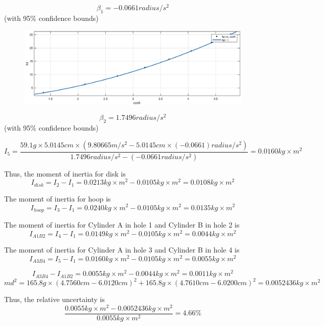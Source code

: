 $$ \beta_1 = -0.0661 radius/s^2$$ (with 95\% confidence bounds) 

\begin{figure}[H]
\centering
\includegraphics[width=\EFWwr]{matlab/ccda}
\end{figure}

$$ \beta_2 = 1.7496 radius/s^2$$ (with 95\% confidence bounds) 


$$ I_5 = \frac{59.1 g \times 5.0145 cm \times (9.80665 m/s^2 - 5.0145 cm \times (-0.0661) radius/s^2 )}{ 1.7496 radius/s^2 -(-0.0661 radius/s^2) } = 0.0160 kg\times m^2 $$

Thus, the moment of inertia for disk is 
$$ I_{disk} = I_2 - I_1 = 0.0213  kg\times m^2 - 0.0105 kg\times m^2 =  0.0108  kg\times m^2 $$

The moment of inertia for hoop is 
$$ I_{hoop} = I_3 - I_1 = 0.0240  kg\times m^2 - 0.0105 kg\times m^2 =  0.0135  kg\times m^2 $$

The moment of inertia for Cylinder A in hole 1 and Cylinder B in hole 2 is 
$$ I_{A1B2} = I_4 - I_1 = 0.0149  kg\times m^2 - 0.0105 kg\times m^2 =  0.0044  kg\times m^2 $$

The moment of inertia for Cylinder A in hole 3 and Cylinder B in hole 4 is 
$$ I_{A3B4} = I_5 - I_1 = 0.0160  kg\times m^2 - 0.0105 kg\times m^2 =  0.0055  kg\times m^2 $$

$$ I_{A3B4} -I_{A1B2} =0.0055  kg\times m^2 -   0.0044  kg\times m^2 = 0.0011 kg\times m^2  $$
$$ md^2 =  165.8 g \times  (4.7560 cm - 6.0120cm )^2 + 165.8 g \times  (4.7610 cm - 6.0200cm )^2  = 0.0052436 kg\times m^2 $$

Thus, the relative uncertainty is $$ \frac{ 0.0055  kg\times m^2 - 0.0052436 kg \times m^2}{0.0055  kg\times m^2} = 4.66 \% $$

